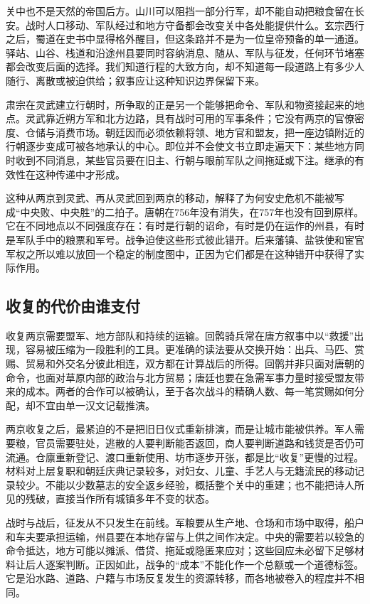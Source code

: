 关中也不是天然的帝国后方。山川可以阻挡一部分行军，却不能自动把粮食留在长安。战时人口移动、军队经过和地方守备都会改变关中各处能提供什么。玄宗西行之后，蜀道在史书中显得格外醒目，但这条路并不是为一位皇帝预备的单一通道。驿站、山谷、栈道和沿途州县要同时容纳消息、随从、军队与征发，任何环节堵塞都会改变后面的选择。我们知道行程的大致方向，却不知道每一段道路上有多少人随行、离散或被迫供给；叙事应让这种知识边界保留下来。

肃宗在灵武建立行朝时，所争取的正是另一个能够把命令、军队和物资接起来的地点。灵武靠近朔方军和北方边路，具有战时可用的军事条件；它没有两京的官僚密度、仓储与消费市场。朝廷因而必须依赖将领、地方官和盟友，把一座边镇附近的行朝逐步变成可被各地承认的中心。即位并不会使文书立即走遍天下：某些地方同时收到不同消息，某些官员要在旧主、行朝与眼前军队之间拖延或下注。继承的有效性在这种传递中才形成。

这种从两京到灵武、再从灵武回到两京的移动，解释了为何安史危机不能被写成“中央败、中央胜”的二拍子。唐朝在756年没有消失，在757年也没有回到原样。它在不同地点以不同强度存在：有时是行朝的诏命，有时是仍在运作的州县，有时是军队手中的粮票和军号。战争迫使这些形式彼此错开。后来藩镇、盐铁使和宦官军权之所以难以放回一个稳定的制度图中，正因为它们都是在这种错开中获得了实际作用。

\subsection{收复的代价由谁支付}
收复两京需要盟军、地方部队和持续的运输。回鹘骑兵常在唐方叙事中以“救援”出现，容易被压缩为一段胜利的工具。更准确的读法要从交换开始：出兵、马匹、赏赐、贸易和外交名分彼此相连，双方都在计算战后的所得。回鹘并非只面对唐朝的命令，也面对草原内部的政治与北方贸易；唐廷也要在急需军事力量时接受盟友带来的成本。两者的合作可以被确认，至于各次战斗的精确人数、每一笔赏赐如何分配，却不宜由单一汉文记载推演。

两京收复之后，最紧迫的不是把旧日仪式重新排演，而是让城市能被供养。军人需要粮，官员需要驻处，逃散的人要判断能否返回，商人要判断道路和钱货是否仍可流通。仓廪重新登记、渡口重新使用、坊市逐步开张，都是比“收复”更慢的过程。材料对上层复职和朝廷庆典记录较多，对妇女、儿童、手艺人与无籍流民的移动记录较少。不能以少数墓志的安全返乡经验，概括整个关中的重建；也不能把诗人所见的残破，直接当作所有城镇多年不变的状态。

战时与战后，征发从不只发生在前线。军粮要从生产地、仓场和市场中取得，船户和车夫要承担运输，州县要在本地存留与上供之间作决定。中央的需要若以较急的命令抵达，地方可能以摊派、借贷、拖延或隐匿来应对；这些回应未必留下足够材料让后人逐案判断。正因如此，战争的“成本”不能化作一个总额或一个道德标签。它是沿水路、道路、户籍与市场反复发生的资源转移，而各地被卷入的程度并不相同。

